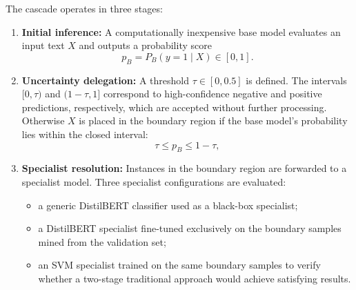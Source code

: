 \documentclass[a4paper,twoside,12pt]{book}
\newcommand{\inputtext}{X}
\newcommand{\predVal}{y}
\newcommand{\mBase}{B}
\newcommand{\thresh}{\tau}
\newcommand{\probSmall}[1]{p_{#1}}
\newcommand{\probLarge}[2]{P_{#1}(\predVal=1 \mid #2)}
\begin{document}
The cascade operates in three stages:

\begin{enumerate}
	\item \textbf{Initial inference:} A computationally inexpensive base model evaluates an input text $\inputtext$ and outputs a probability score
	\begin{equation}
		\probSmall{\mBase} = \probLarge{\mBase}{\inputtext} \in [0,1].
	\end{equation}
	
	\item \textbf{Uncertainty delegation:} A threshold $\thresh \in [0, 0.5]$ is defined. The intervals $[0, \thresh)$ and $(1-\thresh, 1]$ correspond to high-confidence negative and positive predictions, respectively, which are accepted without further processing. Otherwise $\inputtext$ is placed in the boundary region if the base model's probability lies within the closed interval:
	\begin{equation}
		\thresh \le \probSmall{\mBase} \le 1 - \thresh,
	\end{equation}
	
	\item \textbf{Specialist resolution:} Instances in the boundary region are forwarded to a specialist model. Three specialist configurations are evaluated:
	\begin{itemize}
		\item a generic DistilBERT classifier used as a black-box specialist;
		\item a DistilBERT specialist fine-tuned exclusively on the boundary samples mined from the validation set;
		\item an SVM specialist trained on the same boundary samples to verify whether a two-stage traditional approach would achieve satisfying results.
	\end{itemize}
\end{enumerate}
\end{document}
